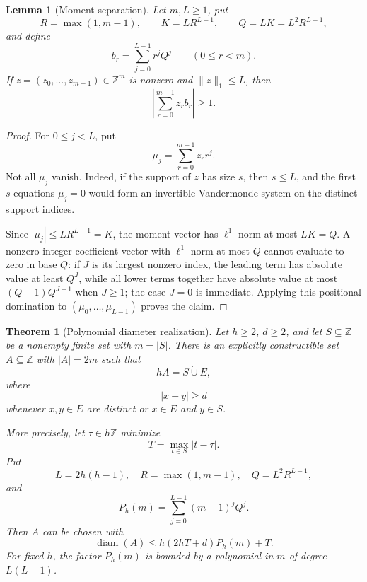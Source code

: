 \documentclass[11pt]{article}
\newtheorem{theorem}{Theorem}
\newtheorem{lemma}{Lemma}
\newcommand{\Z}{\mathbb{Z}}
\begin{document}
\begin{lemma}[Moment separation]\label{lem:moment-separation}
Let $m,L\geq 1$, put
\[
 R=\max(1,m-1),
 \qquad
 K=LR^{L-1},
 \qquad
 Q=LK=L^2R^{L-1},
\]
and define
\[
 b_r=\sum_{j=0}^{L-1}r^jQ^j
 \qquad (0\leq r<m).
\]
If $z=(z_0,\ldots,z_{m-1})\in\Z^m$ is nonzero and
$\lVert z\rVert_1\leq L$, then
\[
 \left|\sum_{r=0}^{m-1}z_rb_r\right|\geq 1.
\]
\end{lemma}

\begin{proof}
For $0\leq j<L$, put
\[
 \mu_j=\sum_{r=0}^{m-1}z_rr^j.
\]
Not all $\mu_j$ vanish. Indeed, if the support of $z$ has size $s$, then
$s\leq L$, and the first $s$ equations $\mu_j=0$ would form an invertible
Vandermonde system on the distinct support indices.

Since $|\mu_j|\leq LR^{L-1}=K$, the moment vector has
$\ell^1$ norm at most $LK=Q$. A nonzero integer coefficient vector with
$\ell^1$ norm at most $Q$ cannot evaluate to zero in base $Q$: if $J$ is
its largest nonzero index, the leading term has absolute value at least
$Q^J$, while all lower terms together have absolute value at most
$(Q-1)Q^{J-1}$ when $J\geq 1$; the case $J=0$ is immediate. Applying this
positional domination to $(\mu_0,\ldots,\mu_{L-1})$ proves the claim.
\end{proof}

\begin{theorem}[Polynomial diameter realization]\label{thm:polynomial}
Let $h\geq 2$, $d\geq 2$, and let $S\subseteq\Z$ be a nonempty finite set
with $m=|S|$. There is an explicitly constructible set $A\subseteq\Z$ with
$|A|=2m$ such that
\[
 hA=S\mathbin{\dot\cup}E,
\]
where
\[
 |x-y|\geq d
\]
whenever $x,y\in E$ are distinct or $x\in E$ and $y\in S$.

More precisely, let $\tau\in h\Z$ minimize
\[
 T=\max_{t\in S}|t-\tau|.
\]
Put
\[
 L=2h(h-1),
 \quad
 R=\max(1,m-1),
 \quad
 Q=L^2R^{L-1},
\]
and
\[
 P_h(m)=\sum_{j=0}^{L-1}(m-1)^jQ^j.
\]
Then $A$ can be chosen with
\[
 \operatorname{diam}(A)
 \leq h(2hT+d)P_h(m)+T.
\]
For fixed $h$, the factor $P_h(m)$ is bounded by a polynomial in $m$ of
degree $L(L-1)$.
\end{theorem}
\end{document}
